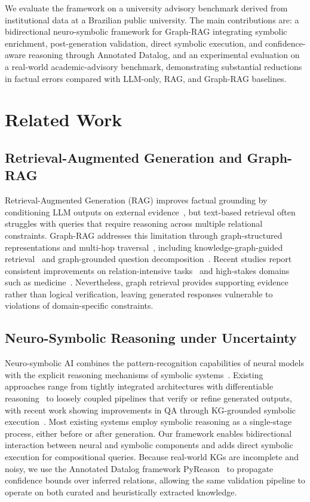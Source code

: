 \documentclass[12pt]{article}
\begin{document}
We evaluate the framework on a university advisory benchmark derived from institutional data at a Brazilian public university. The main contributions are: a bidirectional neuro-symbolic framework for Graph-RAG integrating symbolic enrichment, post-generation validation, direct symbolic execution, and confidence-aware reasoning through Annotated Datalog, and an experimental evaluation on a real-world academic-advisory benchmark, demonstrating substantial reductions in factual errors compared with LLM-only, RAG, and Graph-RAG baselines.


\section{Related Work}

\subsection{Retrieval-Augmented Generation and Graph-RAG}

Retrieval-Augmented Generation (RAG) improves factual grounding by conditioning LLM outputs on external evidence~\cite{cheng2025,brown2025}, but text-based retrieval often struggles with queries that require reasoning across multiple relational constraints. Graph-RAG addresses this limitation through graph-structured representations and multi-hop traversal~\cite{zhang2025}, including knowledge-graph-guided retrieval~\cite{zhu2025} and graph-grounded question decomposition~\cite{linders2025}. Recent studies report consistent improvements on relation-intensive tasks~\cite{han2025} and high-stakes domains such as medicine~\cite{wu2024}. Nevertheless, graph retrieval provides supporting evidence rather than logical verification, leaving generated responses vulnerable to violations of domain-specific constraints.

\subsection{Neuro-Symbolic Reasoning under Uncertainty}

Neuro-symbolic AI combines the pattern-recognition capabilities of neural models with the explicit reasoning mechanisms of symbolic systems~\cite{garcez2023}. Existing approaches range from tightly integrated architectures with differentiable reasoning~\cite{yu2023} to loosely coupled pipelines that verify or refine generated outputs, with recent work showing improvements in QA through KG-grounded symbolic execution~\cite{saha2026,saxena2026}. Most existing systems employ symbolic reasoning as a single-stage process, either before or after generation. Our framework enables bidirectional interaction between neural and symbolic components and adds direct symbolic execution for compositional queries. Because real-world KGs are incomplete and noisy, we use the Annotated Datalog framework PyReason~\cite{aditya2023} to propagate confidence bounds over inferred relations, allowing the same validation pipeline to operate on both curated and heuristically extracted knowledge.
\end{document}
